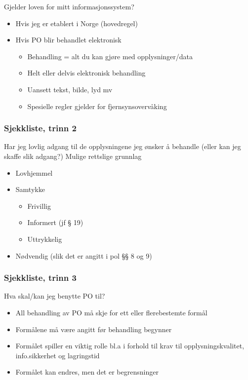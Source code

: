 \documentclass[11pt]{article}
\begin{document}
    Gjelder loven for mitt informasjonssystem? 
\begin{itemize}
\item Hvis jeg er etablert i Norge (hovedregel)
\item Hvis PO blir behandlet elektronisk

\begin{itemize}
\item Behandling = alt du kan gjøre med opplysninger/data
\item Helt eller delvis elektronisk behandling
\item Uansett tekst, bilde, lyd mv
\item Spesielle regler gjelder for fjernsynsovervåking
\end{itemize}

\end{itemize}
\subsubsection{Sjekkliste, trinn 2}
\label{sec-18.1.2}

    Har jeg lovlig adgang til de opplysningene jeg ønsker å behandle (eller kan jeg skaffe slik adgang?)
    Mulige rettslige grunnlag 
\begin{itemize}
\item Lovhjemmel
\item Samtykke

\begin{itemize}
\item Frivillig
\item Informert (jf § 19)
\item Uttrykkelig
\end{itemize}

\item Nødvendig (slik det er angitt i pol §§ 8 og 9)
\end{itemize}
\subsubsection{Sjekkliste, trinn 3}
\label{sec-18.1.3}

    Hva skal/kan jeg benytte PO til? 
\begin{itemize}
\item All behandling av PO må skje for ett eller flerebestemte formål
\item Formålene må være angitt før behandling begynner
\item Formålet spiller en viktig rolle bl.a i forhold til krav til opplysningskvalitet, 
      info.sikkerhet og lagringstid
\item Formålet kan endres, men det er begrensninger
\end{itemize}
\end{document}
